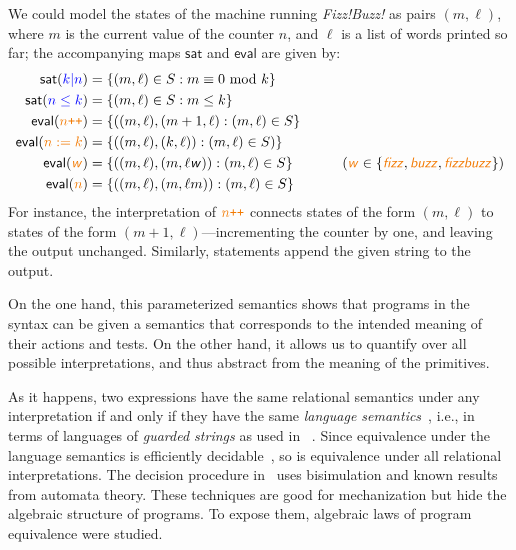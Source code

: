 \documentclass[orivec,envcountsect,envcountsame]{llncs}
\begin{document}
    \begin{example}
    We could model the states of the machine running \emph{Fizz!\@ Buzz!\@} as pairs $(m, \ell)$, where $m$ is the current value of the counter $n$, and $\ell$ is a list of words printed so far; the accompanying maps $\mathsf{sat}$ and $\mathsf{eval}$ are given by:
    \begin{align*}
        \mathsf{sat}(\test{$k|n$}) &= \{ (m, \ell) \in S : m \equiv 0\ \text{mod}\ k \} \\
        \mathsf{sat}(\test{$n \leq k$}) &= \{ (m, \ell) \in S : m \leq k \} \\ %
        \mathsf{eval}(\action{$n\texttt{++}$}) &= \{ ((m, \ell), (m+1, \ell) : (m, \ell) \in S \} \\
        \mathsf{eval}(\action{$n := k$}) &= \{ ((m, \ell), (k, \ell)) : (m, \ell) \in S) \} \\ %
        \mathsf{eval}(\action{\textsf{\textsl{w}}}) &= \{ ((m, \ell), (m, \ell\textsf{\textsl{w}})) : (m, \ell) \in S \} & \tag{$\action{\textsf{\textsl{w}}} \in \{ \action{\textsf{\textsl{fizz}}}, \action{\textsf{\textsl{buzz}}}, \action{\textsf{\textsl{fizzbuzz}}} \}$} \\ %
        \mathsf{eval}(\action{$n$}) &= \{ ((m, \ell), (m, \ell{}m)) : (m, \ell) \in S \}
    \end{align*}
    For instance, the interpretation of $\action{$n\texttt{++}$}$ connects states of the form $(m, \ell)$ to states of the form $(m + 1, \ell)$---incrementing the counter by one, and leaving the output unchanged.
    Similarly,  statements append the given string to the output.
    \end{example}

    On the one hand, this parameterized semantics shows that programs in the \GKAT syntax can be given a semantics that corresponds to the intended meaning of their actions and tests.
    On the other hand, it allows us to quantify over all possible interpretations, and thus abstract from the meaning of the primitives.

    As it happens, two expressions have the same relational semantics under any interpretation if and only if they have the same \emph{language semantics}~\cite{gkatpopl}, i.e., in terms of languages of \emph{guarded strings} as used in \KAT~\cite{katintro}.
    Since equivalence under the language semantics is efficiently decidable~\cite{gkatpopl}, so is equivalence under all relational interpretations.
    The decision procedure in~\cite{gkatpopl} uses bisimulation and known results from automata theory.
    These techniques are good for mechanization but hide the algebraic structure of programs.
    To expose them, algebraic laws of \GKAT program equivalence were studied.
\end{document}
